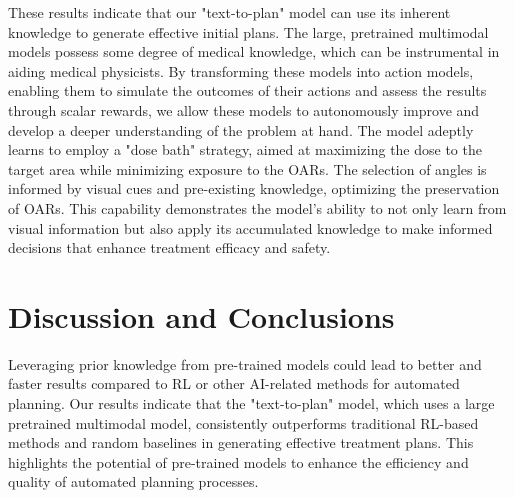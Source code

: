 \documentclass[runningheads]{llncs}
\begin{document}
These results indicate that our "text-to-plan" model can use its inherent knowledge to generate effective initial plans. The large, pretrained multimodal models possess some degree of medical knowledge, which can be instrumental in aiding medical physicists. By transforming these models into action models, enabling them to simulate the outcomes of their actions and assess the results through scalar rewards, we allow these models to autonomously improve and develop a deeper understanding of the problem at hand. The model adeptly learns to employ a "dose bath" strategy, aimed at maximizing the dose to the target area while minimizing exposure to the OARs. The selection of angles is informed by visual cues and pre-existing knowledge, optimizing the preservation of OARs. This capability demonstrates the model's ability to not only learn from visual information but also apply its accumulated knowledge to make informed decisions that enhance treatment efficacy and safety.

\vspace{-3mm}

\section{Discussion and Conclusions}

\vspace{-1mm}

Leveraging prior knowledge from pre-trained models could lead to better and faster results compared to RL or other AI-related methods for automated planning. Our results indicate that the "text-to-plan" model, which uses a large pretrained multimodal model, consistently outperforms traditional RL-based methods and random baselines in generating effective treatment plans. This highlights the potential of pre-trained models to enhance the efficiency and quality of automated planning processes.
\end{document}
